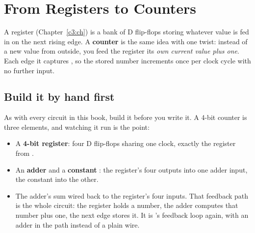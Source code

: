 
\section{From Registers to Counters}
\label{c6:a1}
A register (Chapter~\ref{c3:ch}) is a bank of D flip-flops storing whatever value is fed in on the
next rising edge. A \textbf{counter} is the same idea with one twist: instead of a new value from
outside, you feed the register its \emph{own current value plus one}. Each edge it captures
, so the stored number increments once per clock cycle with no further
input.

\subsection{Build it by hand first}
\label{c6:byhand}
As with every circuit in this book, build it before you write it. A 4-bit counter is three
elements, and watching it run is the point:
\begin{itemize}
  \item A \textbf{4-bit register}: four D flip-flops sharing one clock, exactly the register from
    .
  \item An \textbf{adder} and a \textbf{constant }: the register's four outputs into one
    adder input, the constant into the other.
  \item The adder's sum wired back to the register's four  inputs. That feedback path is
    the whole circuit: the register holds a number, the adder computes that number plus one, the
    next edge stores it. It is 's feedback loop again, with an adder in the path
    instead of a plain wire.
\end{itemize}


